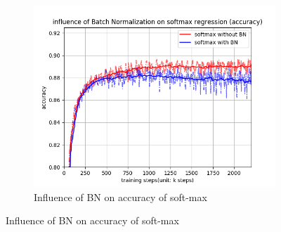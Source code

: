 \documentclass[12pt,letterpaper]{article}
\begin{document}
\begin{figure}[h]
\begin{subfigure}{0.32\textwidth}
    \includegraphics[width=\linewidth]{softmax_BN_acc.png}
    \caption{\small Influence of BN on accuracy of soft-max} \label{fig:b}
    \end{subfigure}
    

\end{figure}
\end{document}
